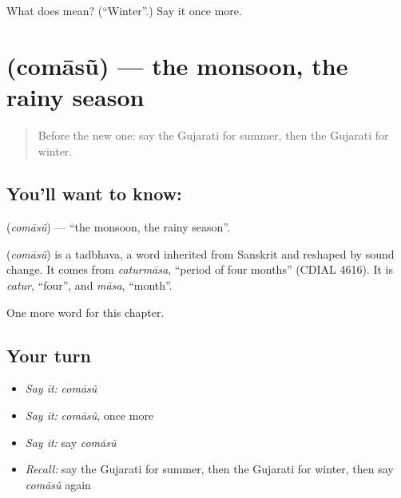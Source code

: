 \begin{tcolorbox}[breakable,colback=teal!4,colframe=teal!35!black,title={Before you move on}]
What does  mean? (\textquotedblleft{}Winter\textquotedblright{}.) Say it once more.
\end{tcolorbox}
\section[\texorpdfstring{\gu{ચોમાસું} (comāsũ)}{ચોમાસું (comāsũ)}]{ (comāsũ) — the monsoon, the rainy season}

\label{lesson:GU-C93-comasu}



\begin{quote}
Before the new one: say the Gujarati for summer, then the Gujarati for winter.
\end{quote}

\subsection*{You'll want to know: }
\textbf{} (\emph{comāsũ}) — \textquotedblleft{}the monsoon, the rainy season\textquotedblright{}.

\begin{cousinweb}
\textbf{} (\emph{comāsũ}) is a tadbhava, a word inherited from Sanskrit and reshaped by sound change. It comes from \emph{caturmāsa}, \textquotedblleft{}period of four months\textquotedblright{} (CDIAL 4616). It is \emph{catur}, \textquotedblleft{}four\textquotedblright{}, and \emph{māsa}, \textquotedblleft{}month\textquotedblright{}.
\end{cousinweb}

\begin{grammarlens}[title={What you've built}]
One more word for this chapter.
\end{grammarlens}

\subsection*{Your turn}
\begin{itemize}
\raggedright
  \item \emph{Say it:} \emph{comāsũ}
  \item \emph{Say it:} \emph{comāsũ}, once more
  \item \emph{Say it:} say \emph{comāsũ}
  \item \emph{Recall:} say the Gujarati for summer, then the Gujarati for winter, then say \emph{comāsũ} again
\end{itemize}

